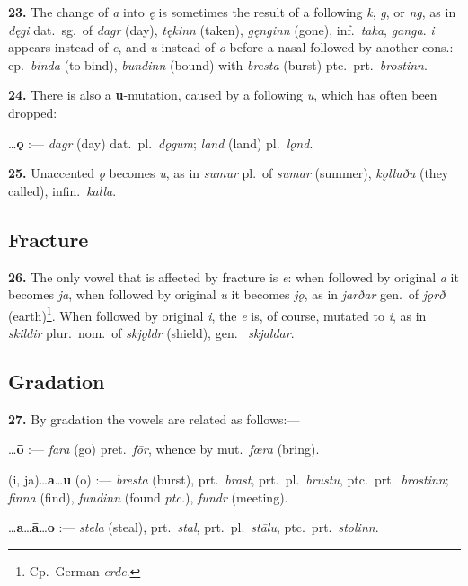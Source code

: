 \documentclass[12pt,letterpaper]{book}
\newcommand{\gap}[1][.25in]{\hspace{#1}}
\begin{document}
\textbf{23.} The change of \textit{a} into \textit{ę} is sometimes the result of a
following \textit{k}, \textit{g}, or \textit{ng}, as in \textit{dęgi} dat.\
sg.\ of \textit{dagr} (day), \textit{tękinn} (taken), \textit{gęnginn} (gone),
inf.\ \textit{taka}, \textit{ganga}.  \textit{i} appears instead of \textit{e}, and
\textit{u} instead of \textit{o} before a nasal followed by another cons.:
cp.\ \textit{binda} (to bind), \textit{bundinn} (bound) with \textit{bresta} (burst)
ptc.\ prt.\ \textit{brostinn}.

\textbf{24.} There is also a {\bf u}-mutation, caused by a following \textit{u},
which has often been dropped:

\gap{\bf a}\ldots {\bf ǫ} :--- \textit{dagr} (day) dat.\ pl.\ \textit{dǫgum};
\textit{land} (land) pl.\ \textit{lǫnd}.

\textbf{25.} Unaccented \textit{ǫ} becomes \textit{u}, as in \textit{sumur} pl.\ of
\textit{sumar} (summer), \textit{kǫlluðu} (they called), infin.\ \textit{kalla}.

\subsection{Fracture}

\textbf{26.} The only vowel that is affected by fracture is \textit{e}: when
followed by original \textit{a} it becomes \textit{ja}, when followed by
original \textit{u} it becomes \textit{jǫ}, as in \textit{jarðar} gen.\ of
\textit{jǫrð} (earth)\footnote{Cp.\ German \textit{erde}.}.  When followed
by original \textit{i}, the \textit{e} is, of course, mutated to \textit{i},
as in \textit{skildir} plur.\ nom.\ of \textit{skjǫldr} (shield), gen.\ {\it
skjaldar}.

\subsection{Gradation}

\textbf{27.} By gradation the vowels are related as follows:---

\gap{\bf a}\ldots {\bf ō} :--- \textit{fara} (go) pret.\ \textit{fōr}, whence by
mut.\ \textit{fœra} (bring).

\gap{\bf e} (i, ja)\ldots {\bf a}\ldots {\bf u} (o) :--- \textit{bresta}
(burst), prt.\ \textit{brast}, prt.\ pl.\ \textit{brustu}, ptc.\ prt.\ \textit{brostinn};
\textit{finna} (find), \textit{fundinn} (found \textit{ptc.}), \textit{fundr}
(meeting).

\gap{\bf e}\ldots {\bf a}\ldots {\bf ā}\ldots {\bf o} :--- \textit{stela} (steal),
prt.\ \textit{stal}, prt.\ pl.\ \textit{stālu}, ptc.\ prt.\ \textit{stolinn}.
\end{document}
